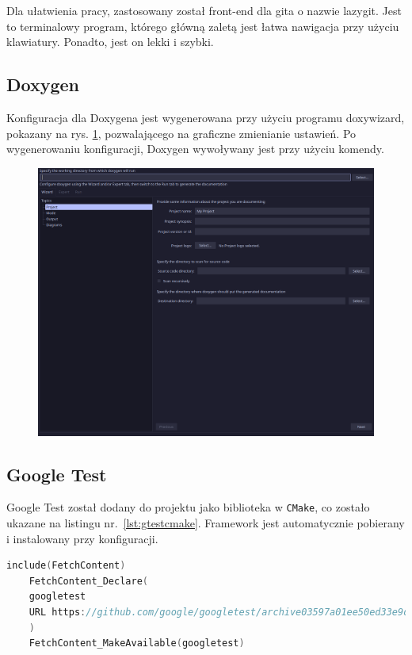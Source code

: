 Dla ułatwienia pracy, zastosowany został front-end dla gita o nazwie lazygit. Jest to terminalowy program, którego główną zaletą jest łatwa nawigacja przy użyciu klawiatury. Ponadto, jest on lekki i szybki.

\subsection{Doxygen}

Konfiguracja dla Doxygena jest wygenerowana przy użyciu programu doxywizard, pokazany na rys. \ref{fig:doxywizard}, pozwalającego na graficzne zmienianie ustawień. Po wygenerowaniu konfiguracji, Doxygen wywoływany jest przy użyciu komendy.

\begin{figure}[H]
	\centering
	\includegraphics[width=1\textwidth]{images/doxywizard.png}
	\caption{}
	\label{fig:doxywizard}
\end{figure}

\subsection{Google Test}

Google Test został dodany do projektu jako biblioteka w \texttt{CMake}, co zostało ukazane na listingu nr.~\ref{lst:gtestcmake}. Framework jest automatycznie pobierany i instalowany przy konfiguracji.

\begin{lstlisting}[caption=Dodanie Google Test do projektu, label={lst:gtestcmake}, language=C++]
	include(FetchContent)
	FetchContent_Declare(
	googletest
	URL https://github.com/google/googletest/archive03597a01ee50ed33e9dfd640b249b4be3799d395.zip
	)
	FetchContent_MakeAvailable(googletest)
	
\end{lstlisting}

